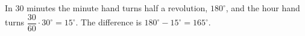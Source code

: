 In $30$ minutes the minute hand turns half a revolution, $180^\circ$, and the hour hand turns $\dfrac{30}{60}\cdot30^\circ=15^\circ$. The difference is $180^\circ-15^\circ=\boxed{165^\circ}$.
